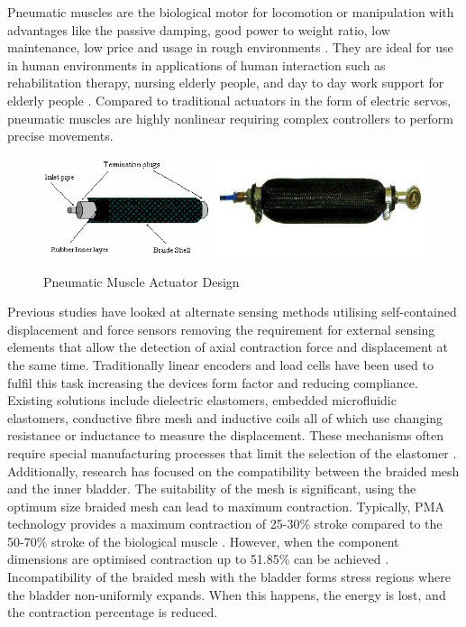 \documentclass[11pt,a4paper]{article}
\begin{document}
Pneumatic muscles are the biological motor for locomotion or manipulation with advantages like the passive damping, good power to weight ratio, low maintenance, low price and usage in rough environments \cite{ranjan_upadhyay_kumar_dhyani_2012}. They are ideal for use in human environments in applications of human interaction such as rehabilitation therapy, nursing elderly people, and day to day work support for elderly people \cite{saga_nagase_saikawa_2006}. Compared to traditional actuators in the form of electric servos, pneumatic muscles are highly nonlinear requiring complex controllers to perform precise movements. \newline

\begin{figure}[hbt!]
    \centering
    \caption{Pneumatic Muscle Actuator Design \cite{pneumatic_image}}
    \includegraphics[scale=0.6]{Pneumatic-Muscle-Actuator-Design.png}
    \label{fig:pneumatic_design}
\end{figure}

Previous studies have looked at alternate sensing methods utilising self-contained displacement and force sensors removing the requirement for external sensing elements that allow the detection of axial contraction force and displacement at the same time. Traditionally linear encoders and load cells have been used to fulfil this task increasing the devices form factor and reducing compliance. Existing solutions include dielectric elastomers, embedded microfluidic elastomers, conductive fibre mesh and inductive coils all of which use changing resistance or inductance to measure the displacement. These mechanisms often require special manufacturing processes that limit the selection of the elastomer \cite{erin_pol_valle_park_2016}. 
Additionally, research has focused on the compatibility between the braided mesh and the inner bladder. The suitability of the mesh is significant, using the optimum size braided mesh can lead to maximum contraction. Typically, PMA technology provides a maximum contraction of 25-30\% stroke compared to the 50-70\% stroke of the biological muscle \cite{andrikopoulos_nikolakopoulos_2017}. However, when the component dimensions are optimised contraction up to 51.85\% can be achieved \cite{najmuddin_mustaffa_2017}. Incompatibility of the braided mesh with the bladder forms stress regions where the bladder non-uniformly expands. When this happens, the energy is lost, and the contraction percentage is reduced. \newline
\end{document}
